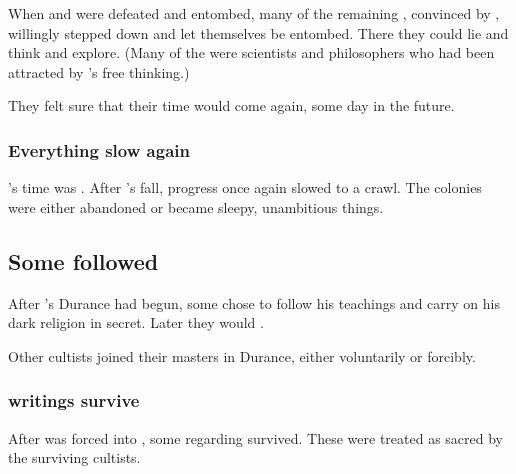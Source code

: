 When \Sethicus and \Tiamat were defeated and entombed, many of the remaining \dragons, convinced by \Nexagglachel, willingly stepped down and let themselves be entombed.
There they could lie and think and explore. 
(Many of the \dragons were scientists and philosophers who had been attracted by \Sethicus's free thinking.)

They felt sure that their time would come again, some day in the future. 





\subsubsection{Everything slow again}
\Sethicus's time was . 
After \Sethicus's fall, \ophidian progress once again slowed to a crawl. 
The colonies were either abandoned or became sleepy, unambitious things. 









\subsection{Some \ophidians followed \Sethicus}
After \Sethicus's Durance had begun, some \ophidians chose to follow his teachings and carry on his dark religion in secret. 
Later they would . 

Other \Sethican cultists joined their \draconian masters in Durance, either voluntarily or forcibly. 




\subsubsection{\Sethican writings survive}
After \Sethicus was forced into , some  regarding  survived. 
These were treated as sacred by the surviving \Sethican cultists. 
















